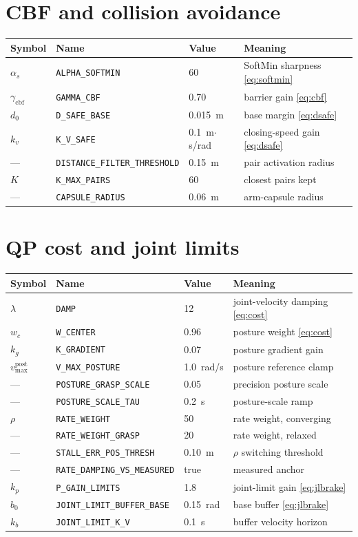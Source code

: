 \section{CBF and collision avoidance}
\begin{tabularx}{\linewidth}{@{}l>{\scriptsize}ll>{\raggedright\arraybackslash}X@{}}
\toprule
Symbol & Name & Value & Meaning \\
\midrule
$\alpha_s$ & \texttt{ALPHA\_SOFTMIN} & 60 & SoftMin sharpness \eqref{eq:softmin} \\
$\gamma_{\text{cbf}}$ & \texttt{GAMMA\_CBF} & 0.70 & barrier gain \eqref{eq:cbf} \\
$d_0$ & \texttt{D\_SAFE\_BASE} & 0.015~m & base margin \eqref{eq:dsafe} \\
$k_v$ & \texttt{K\_V\_SAFE} & 0.1~m$\cdot$s/rad & closing-speed gain \eqref{eq:dsafe} \\
--- & \texttt{DISTANCE\_FILTER\_THRESHOLD} & 0.15~m & pair activation radius \\
$K$ & \texttt{K\_MAX\_PAIRS} & 60 & closest pairs kept \\
--- & \texttt{CAPSULE\_RADIUS} & 0.06~m & arm-capsule radius \\
\bottomrule
\end{tabularx}

\section{QP cost and joint limits}
\begin{tabularx}{\linewidth}{@{}l>{\scriptsize}ll>{\raggedright\arraybackslash}X@{}}
\toprule
Symbol & Name & Value & Meaning \\
\midrule
$\lambda$ & \texttt{DAMP} & 12 & joint-velocity damping \eqref{eq:cost} \\
$w_c$ & \texttt{W\_CENTER} & 0.96 & posture weight \eqref{eq:cost} \\
$k_g$ & \texttt{K\_GRADIENT} & 0.07 & posture gradient gain \\
$v_{\max}^{\text{post}}$ & \texttt{V\_MAX\_POSTURE} & 1.0~rad/s & posture reference clamp \\
--- & \texttt{POSTURE\_GRASP\_SCALE} & 0.05 & precision posture scale \\
--- & \texttt{POSTURE\_SCALE\_TAU} & 0.2~s & posture-scale ramp \\
$\rho$ & \texttt{RATE\_WEIGHT} & 50 & rate weight, converging \\
--- & \texttt{RATE\_WEIGHT\_GRASP} & 20 & rate weight, relaxed \\
--- & \texttt{STALL\_ERR\_POS\_THRESH} & 0.10~m & $\rho$ switching threshold \\
--- & \texttt{RATE\_DAMPING\_VS\_MEASURED} & true & measured anchor \\
$k_p$ & \texttt{P\_GAIN\_LIMITS} & 1.8 & joint-limit gain \eqref{eq:jlbrake} \\
$b_0$ & \texttt{JOINT\_LIMIT\_BUFFER\_BASE} & 0.15~rad & base buffer \eqref{eq:jlbrake} \\
$k_b$ & \texttt{JOINT\_LIMIT\_K\_V} & 0.1~s & buffer velocity horizon \\
\bottomrule
\end{tabularx}

